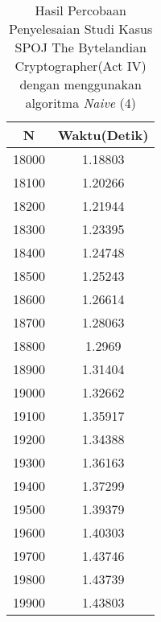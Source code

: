 \begin{table}[H]
\centering
\caption {Hasil Percobaan Penyelesaian Studi Kasus SPOJ The Bytelandian Cryptographer(Act IV) dengan menggunakan algoritma \textit{Naive} (4)}
\begin{tabular}{|c|c|}\hline
N&Waktu(Detik)\\ \hline
18000&1.18803\\ \hline
18100&1.20266\\ \hline
18200&1.21944\\ \hline
18300&1.23395\\ \hline
18400&1.24748\\ \hline
18500&1.25243\\ \hline
18600&1.26614\\ \hline
18700&1.28063\\ \hline
18800&1.2969\\ \hline
18900&1.31404\\ \hline
19000&1.32662\\ \hline
19100&1.35917\\ \hline
19200&1.34388\\ \hline
19300&1.36163\\ \hline
19400&1.37299\\ \hline
19500&1.39379\\ \hline
19600&1.40303\\ \hline
19700&1.43746\\ \hline
19800&1.43739\\ \hline
19900&1.43803\\ \hline
\end{tabular}
\label{tab:res10}
\end{table}